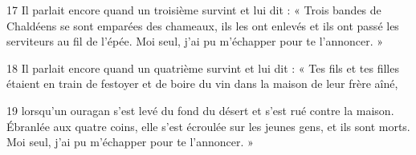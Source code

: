
17 Il parlait encore quand un troisième survint et lui dit : « Trois bandes de Chaldéens se sont emparées des chameaux, ils les ont enlevés et ils ont passé les serviteurs au fil de l’épée. Moi seul, j’ai pu m’échapper pour te l’annoncer. »

18 Il parlait encore quand un quatrième survint et lui dit : « Tes fils et tes filles étaient en train de festoyer et de boire du vin dans la maison de leur frère aîné,

19 lorsqu’un ouragan s’est levé du fond du désert et s’est rué contre la maison. Ébranlée aux quatre coins, elle s’est écroulée sur les jeunes gens, et ils sont morts. Moi seul, j’ai pu m’échapper pour te l’annoncer. »
